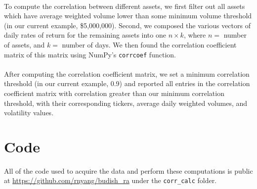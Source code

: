 \documentclass[11pt]{article}
\begin{document}
\paragraph{}
To compute the correlation between different assets, we first filter out all assets which have average weighted volume lower than some minimum volume threshold (in our current example, \$5,000,000). Second, we composed the various vectors of daily rates of return for the remaining assets into one $n \times k$, where $n = $ number of assets, and $k = $ number of days. We then found the correlation coefficient matrix of this matrix using NumPy's \texttt{corrcoef} function.

\paragraph{}
After computing the correlation coefficient matrix, we set a minimum correlation threshold (in our current example, 0.9) and reported all entries in the correlation coefficient matrix with correlation greater than our minimum correlation threshold, with their corresponding tickers, average daily weighted volumes, and volatility values.

\section{Code}

\paragraph{}
All of the code used to acquire the data and perform these computations is public at \url{https://github.com/rnyang/budish_ra} under the \texttt{corr\_calc} folder.
\end{document}
